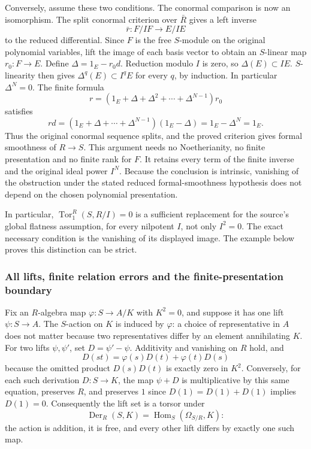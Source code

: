Conversely, assume these two conditions. The conormal comparison is now an isomorphism. The split conormal criterion over \(\bar R\) gives a left inverse \[
\bar r:F/IF\longrightarrow E/IE
\] to the reduced differential. Since \(F\) is the free \(S\)-module on the original polynomial variables, lift the image of each basis vector to obtain an \(S\)-linear map \(r_0:F\to E\). Define \(\Delta=1_E-r_0d\). Reduction modulo \(I\) is zero, so \(\Delta(E)\subset IE\). \(S\)-linearity then gives \(\Delta^q(E)\subset I^qE\) for every \(q\), by induction. In particular \(\Delta^N=0\). The finite formula \[
r=(1_E+\Delta+\Delta^2+\cdots+\Delta^{N-1})r_0
\] satisfies \[
rd=(1_E+\Delta+\cdots+\Delta^{N-1})(1_E-\Delta)=1_E-\Delta^N=1_E.
\] Thus the original conormal sequence splits, and the proved criterion gives formal smoothness of \(R\to S\). This argument needs no Noetherianity, no finite presentation and no finite rank for \(F\). It retains every term of the finite inverse and the original ideal power \(I^N\). Because the conclusion is intrinsic, vanishing of the obstruction under the stated reduced formal-smoothness hypothesis does not depend on the chosen polynomial presentation.

In particular, \(\operatorname{Tor}_1^R(S,R/I)=0\) is a sufficient replacement for the source's global flatness assumption, for every nilpotent \(I\), not only \(I^2=0\). The exact necessary condition is the vanishing of its displayed image. The example below proves this distinction can be strict.

\subsubsection{All lifts, finite relation errors and the finite-presentation boundary}\label{algebra-proof-048-all-lifts-finite-relation-errors-and-the-finite-presentation-boundary}

Fix an \(R\)-algebra map \(\varphi:S\to A/K\) with \(K^2=0\), and suppose it has one lift \(\psi:S\to A\). The \(S\)-action on \(K\) is induced by \(\varphi\): a choice of representative in \(A\) does not matter because two representatives differ by an element annihilating \(K\). For two lifts \(\psi,\psi'\), set \(D=\psi'-\psi\). Additivity and vanishing on \(R\) hold, and \[
D(st)=\varphi(s)D(t)+\varphi(t)D(s)
\] because the omitted product \(D(s)D(t)\) is exactly zero in \(K^2\). Conversely, for each such derivation \(D:S\to K\), the map \(\psi+D\) is multiplicative by this same equation, preserves \(R\), and preserves \(1\) since \(D(1)=D(1)+D(1)\) implies \(D(1)=0\). Consequently the lift set is a torsor under \[
\operatorname{Der}_R(S,K)=\operatorname{Hom}_S(\Omega_{S/R},K):
\] the action is addition, it is free, and every other lift differs by exactly one such map.

